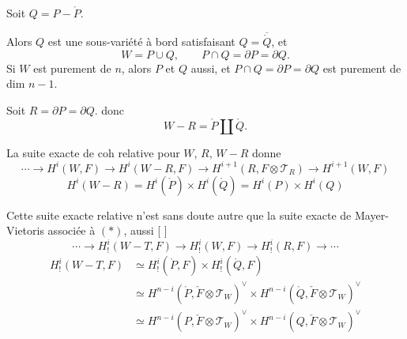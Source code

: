 \documentclass[11pt,a4paper]{article}
\begin{document}
Soit $Q = P - \mathring{P}$.

Alors $Q$ est une sous-variété à bord satisfaisant $Q = \overline{\mathring{Q}}$, et
\[
  W = P \cup Q, \qquad P \cap Q = \partial P = \partial Q .
\]
Si $W$ est purement de  $n$, alors $P$ et $Q$ aussi, et
$P \cap Q = \partial P = \partial Q$ est purement de dim $n - 1$.

Soit $R = \partial P = \partial Q$. \ill{} \struck{\ill{}} \ill{} donc
\[
  W - R = \mathring{P} \amalg \mathring{Q} .
\]



La suite exacte de coh relative pour $W$, $R$, $W - R$ donne
\[
  \cdots \to H^{i}(W, F) \to H^{i}(W - R, F) \to H^{i+1}(R, F \otimes \mathcal{T}_{R})
  \to H^{i+1}(W, F)
\]
\[
  H^{i}(W - R) = H^{i}(\mathring{P}) \times H^{i}(\mathring{Q}) = H^{i}(P) \times H^{i}(Q)
\]

Cette suite exacte relative n'est sans doute autre que la suite exacte de
Mayer-Vietoris associée à $(*)$, \ill{} aussi [\ill{} 
]
\[
  \cdots \to H^{i}_{!}(W - T, F) \to H^{i}_{!}(W, F) \to H^{i}_{!}(R, F) \to \cdots
\]
\[
  \begin{aligned}
  H^{i}_{!}(W - T, F) &\simeq H^{i}_{!}(\mathring{P}, F) \times H^{i}_{!}(\mathring{Q}, F) \\
  &\simeq H^{n-i}(\mathring{P}, \check{F} \otimes \mathcal{T}_W)^\vee \times
     H^{n-i}(\mathring{Q}, \check{F} \otimes \mathcal{T}_W)^\vee \\
  &\simeq H^{n-i}(P, \check{F} \otimes \mathcal{T}_W)^\vee \times
     H^{n-i}(Q, \check{F} \otimes \mathcal{T}_W)^\vee
  \end{aligned}
\]
\end{document}
